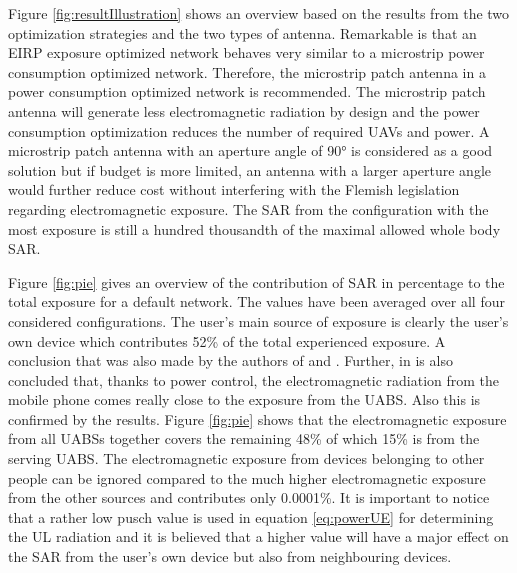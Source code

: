 \documentclass[twocolumn]{phdsymp} %
\begin{document}
Figure \ref{fig:resultIllustration} shows an overview based on the results from the two optimization strategies and the two types of antenna.
Remarkable is that an \gls{EIRP} exposure optimized network behaves very similar to a microstrip power consumption optimized network.
Therefore, the microstrip patch antenna in a power consumption optimized network is recommended. 
The microstrip patch antenna will generate less electromagnetic radiation by design and
the power consumption optimization reduces the number of required \gls{UAV}s and power. A microstrip patch antenna with an aperture 
angle of \ang{90} is considered as a good solution but if budget is more limited, an antenna with a larger aperture angle 
would further reduce cost without interfering with the Flemish legislation regarding electromagnetic exposure.
The \gls{SAR} from the configuration with the most exposure is still a hundred thousandth of the maximal allowed whole body \gls{SAR}.


Figure \ref{fig:pie} gives
an overview of the contribution of \gls{SAR} in percentage to the total 
exposure for a default network. The values have been averaged over all four considered configurations. 
The user's main source of exposure is clearly the user's own device which contributes 52\% of the total experienced exposure.
A conclusion that was also made by the authors of \cite{J17_kuehn2019modelling} and  \cite{J10.1.1}.
Further, in \cite{J10.1.1} is also concluded that,
thanks to power control, the electromagnetic radiation from the mobile phone 
comes really close to the exposure from the \gls{UABS}. 
Also this is confirmed by the results. Figure \ref{fig:pie} shows that the electromagnetic exposure 
from all \gls{UABS}s together covers the remaining 48\% of which 15\% is from the serving UABS. 
The electromagnetic
 exposure from devices belonging to other people can be ignored compared to the much higher electromagnetic exposure from the other sources
 and contributes only 0.0001\%. It is important to notice that a rather low \gls{pusch} value is used in equation \ref{eq:powerUE} for determining the 
 \gls{UL} radiation and it is believed that a higher value will have a major effect on the \gls{SAR} from the user's own 
 device but also from neighbouring devices.

\end{document}
